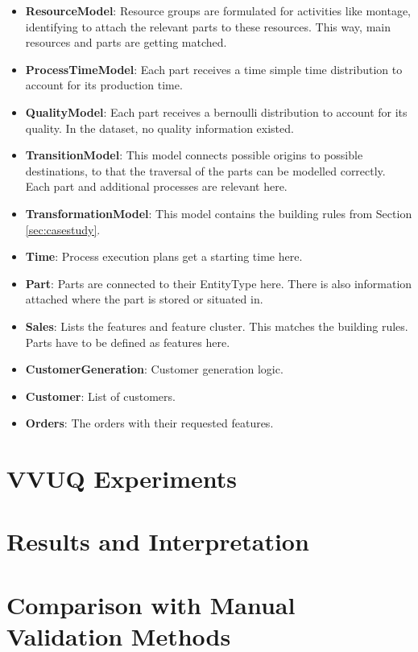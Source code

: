 \begin{itemize}
  \item \textbf{ResourceModel}: Resource groups are formulated for activities like montage, identifying to attach the relevant parts to these resources. This way, main resources and parts are getting matched.
  \item \textbf{ProcessTimeModel}: Each part receives a time simple time distribution to account for its production time.
  \item \textbf{QualityModel}: Each part receives a bernoulli distribution to account for its quality. In the dataset, no quality information existed.
  \item \textbf{TransitionModel}: This model connects possible origins to possible destinations, to that the traversal of the parts can be modelled correctly. Each part and additional processes are relevant here.
  \item \textbf{TransformationModel}: This model contains the building rules from Section \ref{sec:casestudy}.
  \item \textbf{Time}: Process execution plans get a starting time here.
  \item \textbf{Part}: Parts are connected to their EntityType here. There is also information attached where the part is stored or situated in.
  \item \textbf{Sales}: Lists the features and feature cluster. This matches the building rules. Parts have to be defined as features here.
  \item \textbf{CustomerGeneration}: Customer generation logic.
  \item \textbf{Customer}: List of customers.
  \item \textbf{Orders}: The orders with their requested features.
\end{itemize}
\section{VVUQ Experiments}


\section{Results and Interpretation}

\section{Comparison with Manual Validation Methods}
